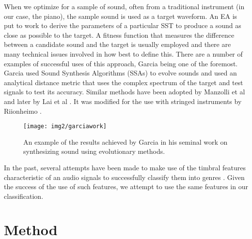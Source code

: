 \documentclass{pnastwo}
\begin{document}
\begin{article}
When we optimize for a sample of sound, often from a traditional instrument (in our case, the piano), the sample sound is used as a target waveform. An EA is put to work to derive the parameters of a particular SST to produce a sound as close as possible to the target. A fitness function that measures the difference between a candidate sound and the target is usually employed and there are many technical issues involved in how best to define this. There are a
number of examples of successful uses of this approach, Garcia \cite{garcia} being one of the foremost. Garcia used Sound Synthesis Algorithms (SSAs) to evolve sounds and used an analytical distance metric that uses the complex spectrum of the target and test signals to test its accuracy. Similar methods have been adopted by Manzolli et al \cite{manzolli} and later by Lai et al \cite{lai}. It was modified for the use with stringed instruments by Riionheimo \cite{heimo}.

\begin{figure}
\centerline{\texttt{[image: img2/garciawork]}}
\caption{An example of the results achieved by Garcia \cite{garcia} in his seminal work on synthesizing sound using evolutionary methods.}\label{fig1}
\end{figure}


In the past, several attempts have been made to make use of the timbral features characteristic of an audio signals to successfully classify them into genres \cite{germ} \cite{gtzan}. Given the success of the use of such features, we attempt to use the same features in our classification. 

\section{Method}

\end{article}
\end{document}
